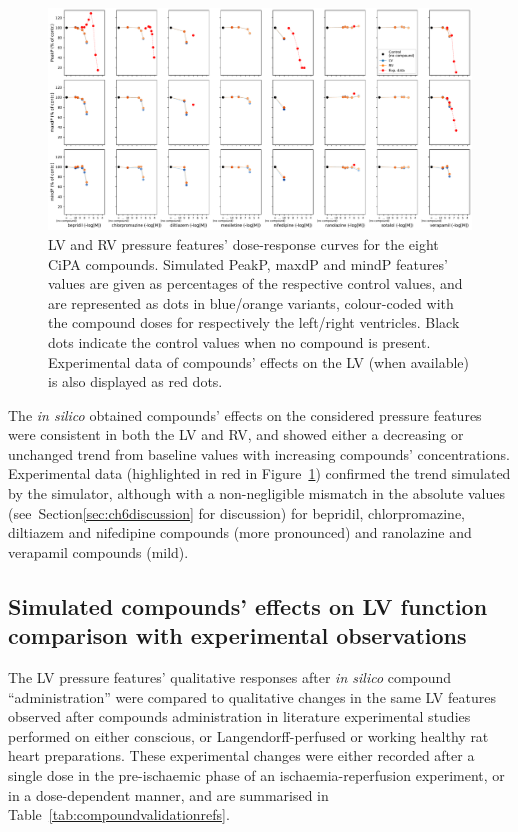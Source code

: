 \begin{figure}[ht!]
    \myfloatalign
    \includegraphics[width=\textwidth]{figures/chapter06/simulated_cipa_compounds_effects_on_lv_rv_pressure_features_with_expdata.pdf}
    \caption{LV and RV pressure features' dose-response curves for the eight CiPA compounds. Simulated PeakP, maxdP and mindP features' values are given as percentages of the respective control values, and are represented as dots in blue/orange variants, colour-coded with the compound doses for respectively the left/right ventricles. Black dots indicate the control values when no compound is present. Experimental data of compounds' effects on the LV (when available) is also displayed as red dots.}
    \label{fig:LVRVfeatsalldrugsrespcurves}
\end{figure}

\vspace{0.2cm}
The \textit{in silico} obtained compounds' effects on the considered pressure features were consistent in both the LV and RV, and showed either a decreasing or unchanged trend from baseline values with increasing compounds' concentrations. Experimental data (highlighted in red in Figure~\ref{fig:LVRVfeatsalldrugsrespcurves}) confirmed the trend simulated by the simulator, although with a non-negligible mismatch in the absolute values (see~Section\ref{sec:ch6discussion} for discussion) for bepridil, chlorpromazine, diltiazem and nifedipine compounds (more pronounced) and ranolazine and verapamil compounds (mild).


%
%
%
\subsection{Simulated compounds' effects on LV function comparison with experimental observations}\label{sec:ch6model_simulated_compounds'_effects_on_whole-organ_function_comparison_with_experimental_observations}
The LV pressure features' qualitative responses after \textit{in silico} compound ``administration'' were compared to qualitative changes in the same LV features observed after compounds administration in literature experimental studies performed on either conscious, or Langendorff-perfused or working healthy rat heart preparations. These experimental changes were either recorded after a single dose in the pre-ischaemic phase of an ischaemia-reperfusion experiment, or in a dose-dependent manner, and are summarised in Table~\ref{tab:compoundvalidationrefs}.

